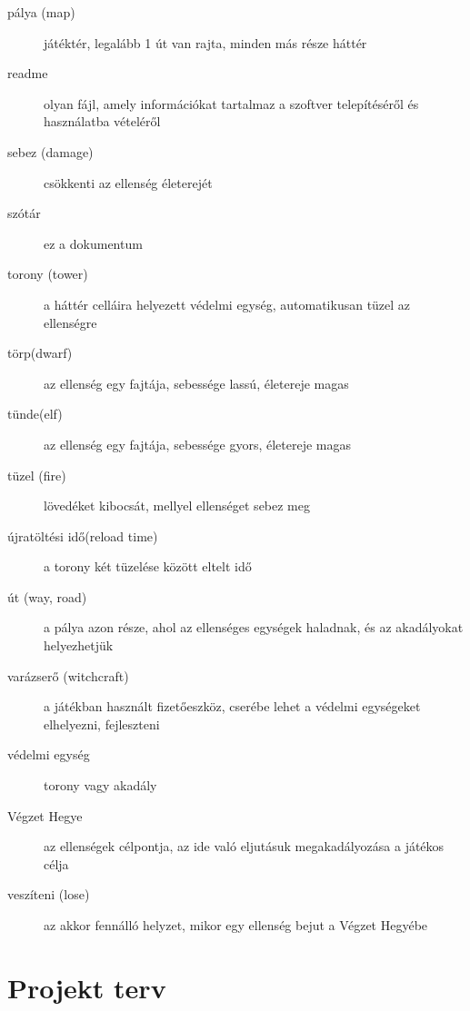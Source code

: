 \begin{description}
\item[pálya (map)] játéktér, legalább 1 út van rajta, minden más része háttér
\item[readme] olyan fájl, amely információkat tartalmaz a szoftver telepítéséről és használatba vételéről
\item[sebez (damage)] csökkenti az ellenség életerejét
\item[szótár] ez a dokumentum
\item[torony (tower)] a háttér celláira helyezett védelmi egység, automatikusan tüzel az ellenségre
\item[törp(dwarf)] az ellenség egy fajtája, sebessége lassú, életereje magas
\item[tünde(elf)] az ellenség egy fajtája, sebessége gyors, életereje magas
\item[tüzel (fire)] lövedéket kibocsát, mellyel ellenséget sebez meg
\item[újratöltési idő(reload time)] a torony két tüzelése között eltelt idő
\item[út (way, road)] a pálya azon része, ahol az ellenséges egységek haladnak, és az akadályokat helyezhetjük
\item[varázserő (witchcraft)] a játékban használt fizetőeszköz, cserébe lehet a védelmi egységeket elhelyezni, fejleszteni
\item[védelmi egység] torony vagy akadály
\item[Végzet Hegye] az ellenségek célpontja, az ide való eljutásuk megakadályozása a játékos célja
\item[veszíteni (lose)] az akkor fennálló helyzet, mikor egy ellenség bejut a Végzet Hegyébe

\end{description}


\section{Projekt terv}
